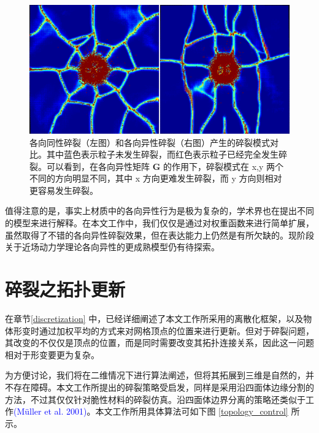 \begin{figure}[!htb]
  \centering
  \captionsetup{justification=centering}
  \includegraphics[width=0.6\linewidth]{chap/image/demo_impact_color_map}

  \caption{\label{demo_impact_color_map}
           各向同性碎裂（左图）和各向异性碎裂（右图）产生的碎裂模式对比。其中蓝色表示粒子未发生碎裂，而红色表示粒子已经完全发生碎裂。可以看到，在各向异性矩阵 $\mathbf{G}$ 的作用下，碎裂模式在 x,y 两个不同的方向明显不同，其中 x 方向更难发生碎裂，而 y 方向则相对更容易发生碎裂。
          }
\end{figure}

值得注意的是，事实上材质中的各向异性行为是极为复杂的，学术界也在提出不同的模型来进行解释。在本文工作中，我们仅仅是通过对权重函数来进行简单扩展，虽然取得了不错的各向异性碎裂效果，但在表达能力上仍然是有所欠缺的。现阶段关于近场动力学理论各向异性的更成熟模型仍有待探索。

\section{碎裂之拓扑更新}
\label{fracture_discretization}
在章节\ref{discretization} 中，已经详细阐述了本文工作所采用的离散化框架，以及物体形变时通过加权平均的方式来对网格顶点的位置来进行更新。但对于碎裂问题，其改变的不仅仅是顶点的位置，而是同时需要改变其拓扑连接关系，因此这一问题相对于形变要更为复杂。

为方便讨论，我们将在二维情况下进行算法阐述，但将其拓展到三维是自然的，并不存在障碍。本文工作所提出的碎裂策略受启发，同样是采用沿四面体边缘分割的方法，不过其仅仅针对脆性材料的碎裂仿真。沿四面体边界分离的策略还类似于工作\textcolor{blue}{(M\"{u}ller et al. 2001)\parencite{Muller2001}}。本文工作所用具体算法可如下图 \ref{topology_control} 所示。

